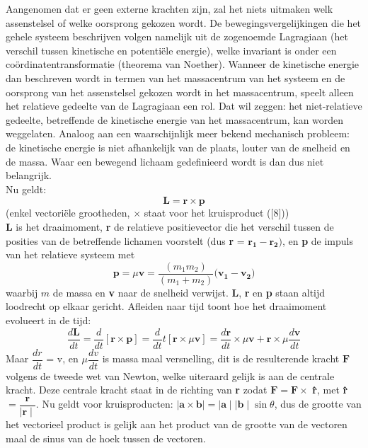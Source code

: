 \documentclass[a4paper]{article}
\begin{document}
\noindent
Aangenomen dat er geen externe krachten zijn, zal het niets uitmaken welk assenstelsel of welke oorsprong gekozen wordt. De bewegingsvergelijkingen die het gehele systeem beschrijven volgen namelijk uit de zogenoemde Lagragiaan (het verschil tussen kinetische en potenti\"ele energie), welke invariant is onder een co\"ordinatentransformatie (theorema van Noether). Wanneer de kinetische energie dan beschreven wordt in termen van het massacentrum van het systeem en de oorsprong van het assenstelsel gekozen wordt in het massacentrum, speelt alleen het relatieve gedeelte van de Lagragiaan een rol. Dat wil zeggen: het niet-relatieve gedeelte, betreffende de kinetische energie van het massacentrum, kan worden weggelaten. Analoog aan een waarschijnlijk meer bekend mechanisch probleem: de kinetische energie is niet afhankelijk van de plaats, louter van de snelheid en de massa. Waar een bewegend lichaam gedefinieerd wordt is dan dus niet belangrijk.\\
	 	Nu geldt: 
	 	\begin{equation}
	 		\textbf{L} = \textbf{r} \times \textbf{p}
	 	\end{equation} 	(enkel vectori\"ele grootheden, $\times$ staat voor het kruisproduct ([8]))\\
	 	\textbf{L} is het draaimoment, \textbf{r} de relatieve positievector die het verschil tussen de posities van de betreffende lichamen voorstelt (dus \textbf{r} = $\mathbf{r_1} - \mathbf{r_2})$, en \textbf{p} de impuls van het relatieve systeem met  
	 	\begin{equation}
	 		\textbf{p} = \mu\textbf{v} = \frac{(m_1 m_2)}{(m_1+m_2)} \mathbf(\mathbf{v_1} - \mathbf{v_2})
	 	\end{equation}
	 	waarbij $m$ de massa en \textbf{v} naar de snelheid verwijst. \textbf{L}, \textbf{r} en \textbf{p} staan altijd loodrecht op elkaar gericht.
	 	Afleiden naar tijd toont hoe het draaimoment evolueert in de tijd:\\
	 	\begin{equation}
	 		\dfrac{d\mathbf{L}}{dt}  =  \dfrac{d}{dt} [\mathbf{r}\times\mathbf{p}]  =  \frac{d}{dt}t [\mathbf{r}\times\mu\mathbf{v}]  =  \frac{d\mathbf{r}}{dt}\times \mu \mathbf{v}+\mathbf{r}\times \mu \frac{d\mathbf{v}}{dt}
	 	\end{equation} 
	 	Maar $\dfrac{dr}{dt}$ = v, en $\mu\dfrac{dv}{dt}$ is massa maal versnelling, dit is de resulterende kracht $\mathbf{F}$ volgens de tweede wet van Newton, welke uiteraard gelijk is aan de centrale kracht. Deze centrale kracht staat in de richting van \textbf{r} zodat $\mathbf{F} = \mathbf{F}\times$ \textbf{\^r}, met \textbf{\^r} $= \dfrac{\mathbf{r}}{\mid \mathbf{r} \mid}$. Nu geldt voor kruisproducten: $\mid \mathbf{a} \times \mathbf{b}\mid = \mid \mathbf{a}\mid \mid \mathbf{b}\mid \sin\theta$, dus de grootte van het vectorieel product is gelijk aan het product van de grootte van de vectoren maal de sinus van de hoek tussen de vectoren.
\end{document}
